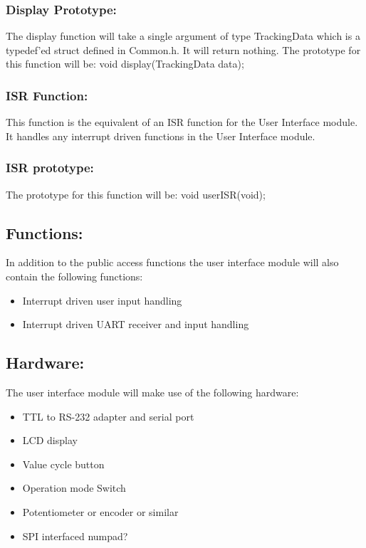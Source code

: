 \documentclass[]{article}
\begin{document}
\subsubsection{Display Prototype:}
The display function will take a single argument of type TrackingData which is a typedef'ed struct defined in Common.h. It will return nothing. The prototype for this function will be:
\newline \newline
void display(TrackingData data);

\subsubsection{ISR Function:}
This function is the equivalent of an ISR function for the User Interface module. It handles any interrupt driven functions in the User Interface module.

\subsubsection{ISR prototype:}
The prototype for this function will be: \newline \newline
void userISR(void);

\subsection{Functions:}
In addition to the public access functions the user interface module will also contain the following functions:

\begin{itemize}
	\item Interrupt driven user input handling
	\item Interrupt driven UART receiver and input handling
\end{itemize}

\subsection{Hardware:}
The user interface module will make use of the following hardware:
\begin{itemize}
	\item TTL to RS-232 adapter and serial port
	\item LCD display
	\item Value cycle button
	\item Operation mode Switch
	\item Potentiometer or encoder or similar
	\item SPI interfaced numpad?
\end{itemize}
\end{document}
